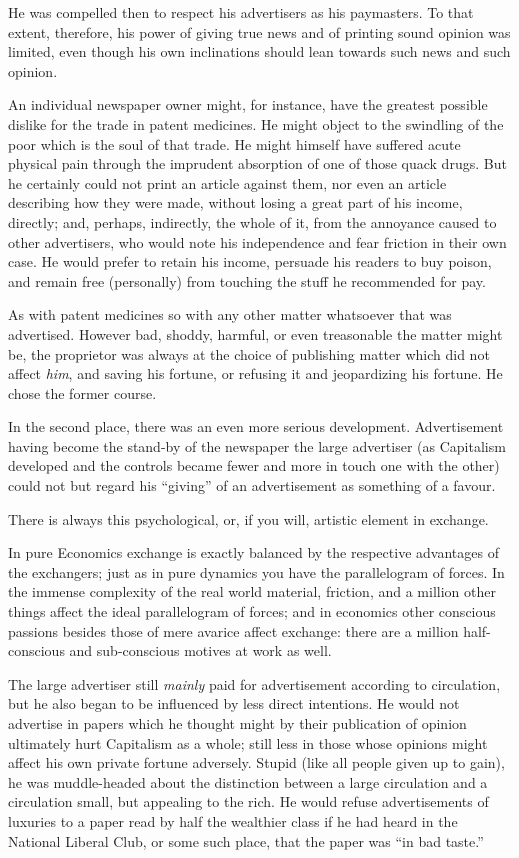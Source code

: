 \documentclass{book}
\begin{document}
He was compelled then to respect his advertisers as his paymasters. To that extent, therefore, his power of giving true news and of printing sound opinion was limited, even though his own inclinations should lean towards such news and such opinion.

An individual newspaper owner might, for instance, have the greatest possible dislike for the trade in patent medicines. He might object to the swindling of the poor which is the soul of that trade. He might himself have suffered acute physical pain through the imprudent absorption of one of those quack drugs. But he certainly could not print an article against them, nor even an article describing how they were made, without losing a great part of his income, directly; and, perhaps, indirectly, the whole of it, from the annoyance caused to other advertisers, who would note his independence and fear friction in their own case. He would prefer to retain his income, persuade his readers to buy poison, and remain free (personally) from touching the stuff he recommended for pay.

As with patent medicines so with any other matter whatsoever that was advertised. However bad, shoddy, harmful, or even treasonable the matter might be, the proprietor was always at the choice of publishing matter which did not affect \emph{him}, and saving his fortune, or refusing it and jeopardizing his fortune. He chose the former course.

In the second place, there was an even more serious development. Advertisement having become the stand-by of the newspaper the large advertiser (as Capitalism developed and the controls became fewer and more in touch one with the other) could not but regard his “giving” of an advertisement as something of a favour.

There is always this psychological, or, if you will, artistic element in exchange.

In pure Economics exchange is exactly balanced by the respective advantages of the exchangers; just as in pure dynamics you have the parallelogram of forces. In the immense complexity of the real world material, friction, and a million other things affect the ideal parallelogram of forces; and in economics other conscious passions besides those of mere avarice affect exchange: there are a million half-conscious and sub-conscious motives at work as well.

The large advertiser still \emph{mainly} paid for advertisement according to circulation, but he also began to be influenced by less direct intentions. He would not advertise in papers which he thought might by their publication of opinion ultimately hurt Capitalism as a whole; still less in those whose opinions might affect his own private fortune adversely. Stupid (like all people given up to gain), he was muddle-headed about the distinction between a large circulation and a circulation small, but appealing to the rich. He would refuse advertisements of luxuries to a paper read by half the wealthier class if he had heard in the National Liberal Club, or some such place, that the paper was “in bad taste.”
\end{document}

